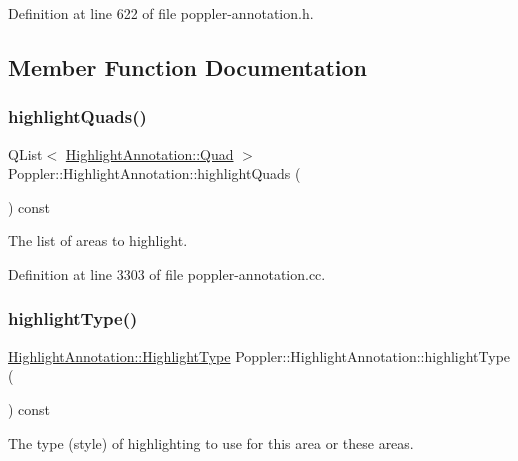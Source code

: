 Definition at line 622 of file poppler-\/annotation.\+h.



\subsection{Member Function Documentation}
\mbox{\label{class_poppler_1_1_highlight_annotation_a9d3811c1d9d60dcb7fcd7bf611d0862e}} 
\subsubsection{\texorpdfstring{highlight\+Quads()}{highlightQuads()}}
{\footnotesize\ttfamily Q\+List$<$ \hyperlink{struct_poppler_1_1_highlight_annotation_1_1_quad}{Highlight\+Annotation\+::\+Quad} $>$ Poppler\+::\+Highlight\+Annotation\+::highlight\+Quads (\begin{DoxyParamCaption}{ }\end{DoxyParamCaption}) const}

The list of areas to highlight. 

Definition at line 3303 of file poppler-\/annotation.\+cc.

\mbox{\label{class_poppler_1_1_highlight_annotation_ae53f82e1935c7d8ca63578bc70956896}} 
\subsubsection{\texorpdfstring{highlight\+Type()}{highlightType()}}
{\footnotesize\ttfamily \hyperlink{class_poppler_1_1_highlight_annotation_ae605e74038eb2a3810a789377524f2a0}{Highlight\+Annotation\+::\+Highlight\+Type} Poppler\+::\+Highlight\+Annotation\+::highlight\+Type (\begin{DoxyParamCaption}{ }\end{DoxyParamCaption}) const}

The type (style) of highlighting to use for this area or these areas. 

